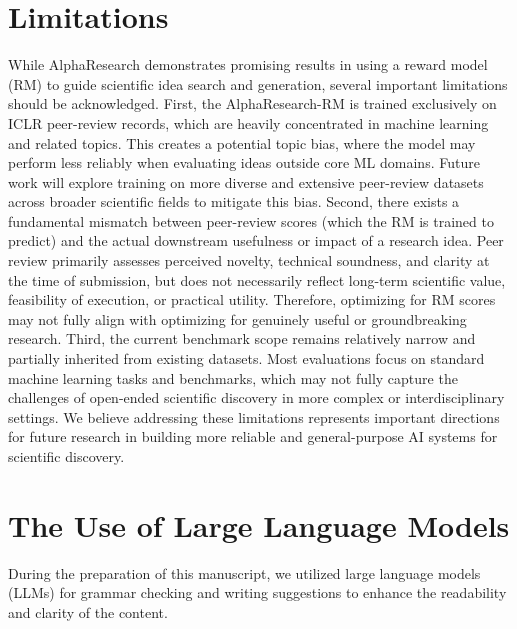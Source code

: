 \newpage

\section{Limitations} 
While AlphaResearch demonstrates promising results in using a reward model (RM) to guide scientific idea search and generation, several important limitations should be acknowledged.
First, the AlphaResearch-RM is trained exclusively on ICLR peer-review records, which are heavily concentrated in machine learning and related topics. This creates a potential topic bias, where the model may perform less reliably when evaluating ideas outside core ML domains. Future work will explore training on more diverse and extensive peer-review datasets across broader scientific fields to mitigate this bias.
Second, there exists a fundamental mismatch between peer-review scores (which the RM is trained to predict) and the actual downstream usefulness or impact of a research idea. Peer review primarily assesses perceived novelty, technical soundness, and clarity at the time of submission, but does not necessarily reflect long-term scientific value, feasibility of execution, or practical utility. Therefore, optimizing for RM scores may not fully align with optimizing for genuinely useful or groundbreaking research.
Third, the current benchmark scope remains relatively narrow and partially inherited from existing datasets. Most evaluations focus on standard machine learning tasks and benchmarks, which may not fully capture the challenges of open-ended scientific discovery in more complex or interdisciplinary settings.
We believe addressing these limitations represents important directions for future research in building more reliable and general-purpose AI systems for scientific discovery.

\section{The Use of Large Language Models}
During the preparation of this manuscript, we utilized large language models (LLMs) for grammar checking and writing suggestions to enhance the readability and clarity of the content.

